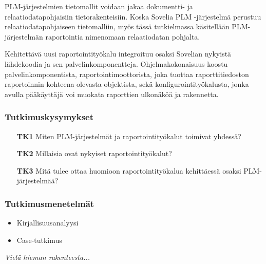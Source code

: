 PLM-järjestelmien tietomallit voidaan jakaa dokumentti- ja relaatiodatapohjaisiin tietorakenteisiin. \cite{david_what_2016} Koska Sovelia PLM -järjestelmä perustuu relaatiodatapohjaiseen tietomalliin, myös tässä tutkielmassa käsitellään PLM-järjestelmän raportointia nimenomaan relaatiodatan pohjalta.

Kehitettävä uusi raportointityökalu integroituu osaksi Sovelian nykyistä lähdekoodia ja sen palvelinkomponentteja. Ohjelmakokonaisuus koostu palvelinkomponentista, raportointimoottorista, joka tuottaa raporttitiedoston raportoinnin kohteena olevasta objektista, sekä konfigurointityökalusta, jonka avulla pääkäyttäjä voi muokata raporttien ulkonäköä ja rakennetta.

\subsubsection{Tutkimuskysymykset}
\begin{itemize}
\item[\textbf{TK1}] Miten PLM-järjestelmät ja raportointityökalut toimivat yhdessä?
\item[\textbf{TK2}] Millaisia ovat nykyiset raportointityökalut?
\item[\textbf{TK3}] Mitä tulee ottaa huomioon raportointityökalua kehittäessä osaksi PLM-järjestelmää?
\end{itemize}

\subsubsection{Tutkimusmenetelmät}
\begin{itemize}
\item Kirjallisuusanalyysi
\item Case-tutkimus
\end{itemize}

\textit{Vielä hieman rakenteesta...}


